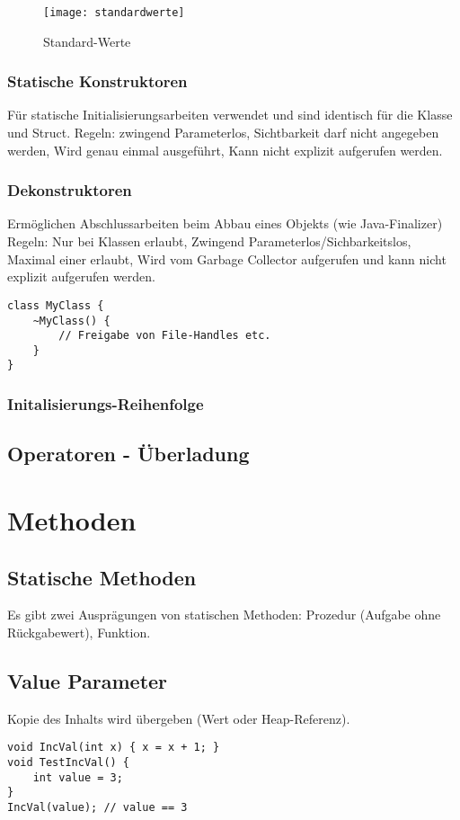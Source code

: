 \begin{figure}[h!]
	\centering
  	\texttt{[image: standardwerte]}
    \caption{Standard-Werte}
\end{figure}

\subsubsection{Statische Konstruktoren}
Für statische Initialisierungsarbeiten verwendet und sind identisch für die Klasse und Struct. Regeln: zwingend Parameterlos, Sichtbarkeit darf nicht angegeben werden, Wird genau einmal ausgeführt, Kann nicht explizit aufgerufen werden.

\subsubsection{Dekonstruktoren}
Ermöglichen Abschlussarbeiten beim Abbau eines Objekts (wie Java-Finalizer) Regeln: Nur bei Klassen erlaubt, Zwingend Parameterlos/Sichbarkeitslos, Maximal einer erlaubt, Wird vom Garbage Collector aufgerufen und kann nicht explizit aufgerufen werden.
\begin{lstlisting}
class MyClass {
	~MyClass() {
		// Freigabe von File-Handles etc.
	}
}
\end{lstlisting}

\subsubsection{Initalisierungs-Reihenfolge}

\subsection{Operatoren - Überladung}

\pagebreak


\section{Methoden}
\subsection{Statische Methoden}
Es gibt zwei Ausprägungen von statischen Methoden: Prozedur (Aufgabe ohne Rückgabewert), Funktion. 

\subsection{Value Parameter}
Kopie des Inhalts wird übergeben (Wert oder Heap-Referenz).
\begin{lstlisting}
void IncVal(int x) { x = x + 1; } 
void TestIncVal() {
	int value = 3;
}
IncVal(value); // value == 3 
\end{lstlisting}

